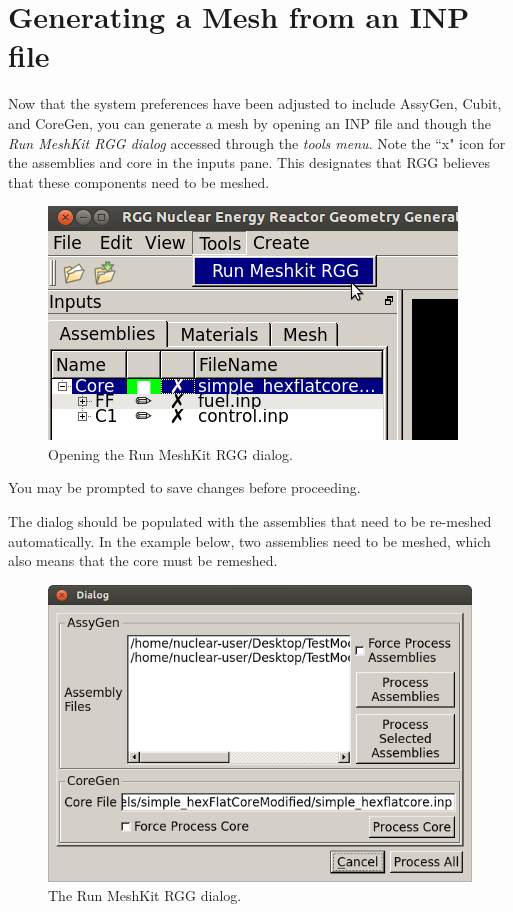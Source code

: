 \section{Generating a Mesh from an INP file}

Now that the system preferences have been adjusted to include AssyGen, Cubit, and CoreGen, you can generate a mesh by opening an INP file and though the \emph{Run MeshKit RGG dialog} accessed through the \emph{tools menu}.  Note the ``x" icon for the assemblies and core in the inputs pane.  This designates that RGG believes that these components need to be meshed.

\begin{figure}[H]
	\begin{center}
		\includegraphics[width=0.5\linewidth]{Images/mesh-3.png}
		\caption{Opening the Run MeshKit RGG dialog.}
		\label{fig:Mesh3}
	\end{center}
\end{figure}

You may be prompted to save changes before proceeding.

The dialog should be populated with the assemblies that need to be re-meshed automatically.  In the example below, two assemblies need to be meshed, which also means that the core must be remeshed.

\begin{figure}[H]
	\begin{center}
		\includegraphics[width=0.5\linewidth]{Images/mesh-4.png}
		\caption{The Run MeshKit RGG dialog.}
		\label{fig:Mesh4}
	\end{center}
\end{figure}

